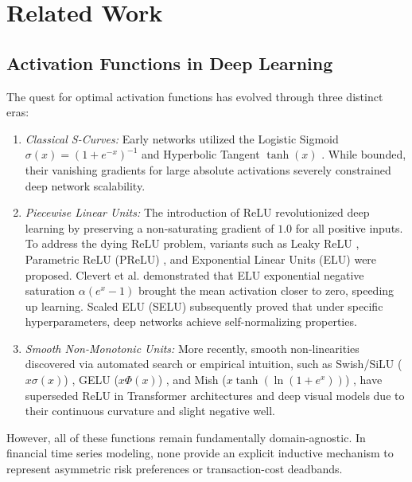 \documentclass[conference]{IEEEtran}
\begin{document}
\section{Related Work}
\subsection{Activation Functions in Deep Learning}
The quest for optimal activation functions has evolved through three distinct eras:
\begin{enumerate}
    \item \textit{Classical S-Curves:} Early networks utilized the Logistic Sigmoid $\sigma(x) = (1 + e^{-x})^{-1}$ and Hyperbolic Tangent $\tanh(x)$ \cite{lecun1998efficient}. While bounded, their vanishing gradients for large absolute activations severely constrained deep network scalability.
    \item \textit{Piecewise Linear Units:} The introduction of ReLU \cite{nair2010rectified} revolutionized deep learning by preserving a non-saturating gradient of $1.0$ for all positive inputs. To address the dying ReLU problem, variants such as Leaky ReLU \cite{maas2013rectifier}, Parametric ReLU (PReLU) \cite{he2015delving}, and Exponential Linear Units (ELU) \cite{clevert2016fast} were proposed. Clevert et al. \cite{clevert2016fast} demonstrated that ELU exponential negative saturation $\alpha(e^x - 1)$ brought the mean activation closer to zero, speeding up learning. Scaled ELU (SELU) \cite{klambauer2017self} subsequently proved that under specific hyperparameters, deep networks achieve self-normalizing properties.
    \item \textit{Smooth Non-Monotonic Units:} More recently, smooth non-linearities discovered via automated search or empirical intuition, such as Swish/SiLU ($x\sigma(x)$) \cite{ramachandran2017swish, elfwing2018sigmoid}, GELU ($x\Phi(x)$) \cite{hendrycks2016gelu}, and Mish ($x\tanh(\ln(1 + e^x))$) \cite{misra2020mish}, have superseded ReLU in Transformer architectures and deep visual models due to their continuous curvature and slight negative well.
\end{enumerate}

However, all of these functions remain fundamentally domain-agnostic. In financial time series modeling, none provide an explicit inductive mechanism to represent asymmetric risk preferences or transaction-cost deadbands.
\end{document}
